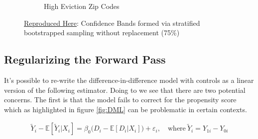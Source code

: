 \documentclass[a4paper,12pt]{article}
\begin{document}
\begin{figure}[htbp]
\begin{subfigure}{.48\textwidth}
    \caption{High Eviction Zip Codes}
\label{fig:diff_control_high}
\end{subfigure}
\caption{ \href{https://github.com/pharringtonp19/evictions/blob/main/scripts/cceh/primary/diff_n_mean_rrh.py}{Reproduced Here}: Confidence Bands formed via stratified bootstrapped sampling without replacement (75\%)}
\label{fig:diff_control}
\end{figure}


\subsection{Regularizing the Forward Pass}
It's possible to re-write the difference-in-difference model with controls as a linear version of the following estimator. Doing to we see that there are two potential concerns. The first is that the model fails to correct for the propensity score which as highlighted in figure \ref{fig:DML} can be problematic in certain contexts.  

\begin{align*}
\tilde{Y}_i - \mathbb{E}[ \tilde{Y}_i | X_i] = \beta_0 \big(D_i - \mathbb{E}[D_i |X_i]\big) + \varepsilon_i, \quad \textrm{where} \ \tilde{Y}_i =  Y_{1i} - Y_{0i} 
\end{align*}
\end{document}
